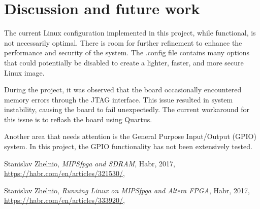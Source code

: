 \documentclass[a4paper]{article}
\begin{document}
\section{Discussion and future work}

The current Linux configuration implemented in this project, while functional,
is not necessarily optimal. There is room for further refinement to enhance the
performance and security of the system. The .config file contains many options
that could potentially be disabled to create a lighter, faster, and more secure
Linux image.

During the project, it was observed that the board occasionally encountered
memory errors through the JTAG interface. This issue resulted in system
instability, causing the board to fail unexpectedly. The current workaround
for this issue is to reflash the board using Quartus.

Another area that needs attention is the General Purpose Input/Output (GPIO)
system. In this project, the GPIO functionality has not been extensively
tested.

\pagebreak

\begin{thebibliography}{99}

Stanislav Zhelnio,
\textit{MIPSfpga and SDRAM},
Habr,
2017,\\
\url{https://habr.com/en/articles/321530/},

Stanislav Zhelnio,
\textit{Running Linux on MIPSfpga and Altera FPGA},
Habr,
2017,\\
\url{https://habr.com/en/articles/333920/},

\end{thebibliography}
\end{document}
